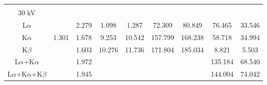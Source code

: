 \begin{table}[ht]
\begin{tabular}{ccccccccc}
        \hline
                                     &        &       &          &          &         &         &         &        \\
        30 kV                        &        &       &          &          &         &         &         &        \\
        L$\alpha$                    &        & 2.279 & 1.098    & 1.287    & 72.309  & 80.849  & 76.465  & 33.546 \\
        K$\alpha$                    & 1.301  & 1.678 & 9.253    & 10.542   & 157.799 & 168.238 & 58.718  & 34.994 \\
        K$\beta$                     &        & 1.603 & 10.276   & 11.736   & 171.804 & 185.034 & 8.821   & 5.503  \\
        L$\alpha$+K$\alpha$          &        & 1.972 &          &          &         &         & 135.184 & 68.540 \\
        L$\alpha$+K$\alpha$+K$\beta$ &        & 1.945 &          &          &         &         & 144.004 & 74.042
    \end{tabular}
\end{table}
